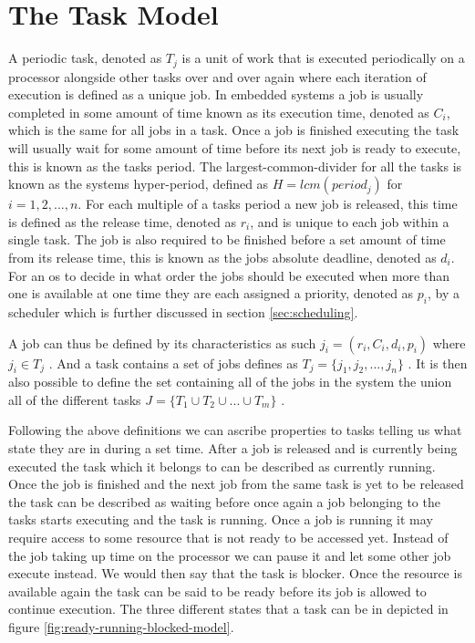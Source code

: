\documentclass{kththesis}
\begin{document}
\section{The Task Model} \label{sec:the_task_model}


A periodic task, denoted as $T_j$ is a unit of work that is executed periodically on a processor
alongside other tasks over and over again where each iteration of execution is defined as a unique
job. In embedded systems a job is usually completed in some amount of time known as its execution
time, denoted as $C_i$, which is the same for all jobs in a task. Once a job is finished executing
the task will usually wait for some amount of time before its next job is ready to execute, this is
known as the tasks period. The largest-common-divider for all the tasks is known as the systems
hyper-period, defined as $H = lcm(period_j)$ for $i = 1, 2, ..., n$. For each multiple of a tasks
period a new job is released, this time is defined as the release time, denoted as $r_i$, and is
unique to each job within a single task. The job is also required to be finished before a set amount
of time from its release time, this is known as the jobs absolute deadline, denoted as $d_i$. For an
\acrshort{os} to decide in what order the jobs should be executed when more than one is available at
one time they are each assigned a priority, denoted as $p_i$, by a scheduler which is further
discussed in section \ref{sec:scheduling}.

A job can thus be defined by its characteristics as such $j_i = (r_i, C_i, d_i, p_i)$ where $j_i \in
T_j$ . And a task contains a set of jobs defines as $T_j = \{j_1, j_2, ..., j_n\}$ . It is then also
possible to define the set containing all of the jobs in the system the union all of the different
tasks $J = \{T_1 \cup T_2 \cup ... \cup T_m\}$ .


Following the above definitions we can ascribe properties to tasks telling us what state they are in
during a set time. After a job is released and is currently being executed the task which it belongs
to can be described as currently running. Once the job is finished and the next job from the same
task is yet to be released the task can be described as waiting before once again a job belonging to
the tasks starts executing and the task is running. Once a job is running it may require access to
some resource that is not ready to be accessed yet. Instead of the job taking up time on the
processor we can pause it and let some other job execute instead. We would then say that the task is
blocker. Once the resource is available again the task can be said to be ready before its job is
allowed to continue execution. The three different states that a task can be in depicted in figure
\ref{fig:ready-running-blocked-model}. 
\end{document}
